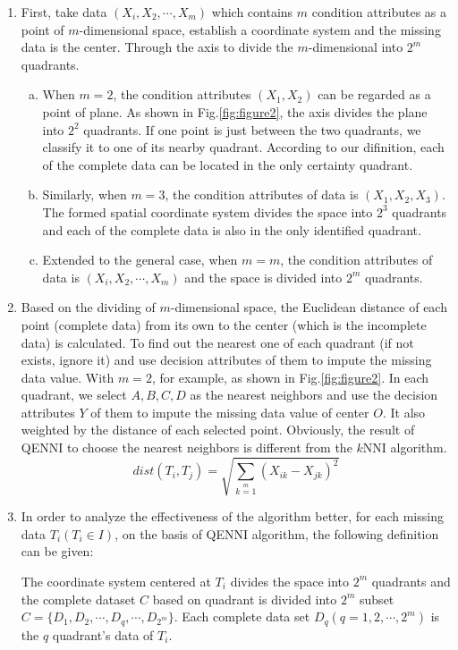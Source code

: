 \documentclass[print]{jicspack}
\begin{document}
\begin{enumerate}[(1)]
\item First, take data $(X_i, X_2, \cdots, X_m)$ which contains $m$ condition attributes as a point of $m$-dimensional space, establish a coordinate system and the missing data is the center. Through the axis to divide the $m$-dimensional into $2^m$ quadrants.
  \begin{enumerate}[a.]
  \item When $m = 2$, the condition attributes $(X_1, X_2)$ can be regarded as a point of plane. As shown in Fig.\ref{fig:figure2}, the axis divides the plane into $2^2$ quadrants. If one point is just between the two quadrants, we classify it to one of its nearby quadrant. According to our difinition, each of the complete data can be located in the only certainty quadrant.
  \item Similarly, when $m = 3$, the condition attributes of data is $(X_1, X_2, X_3)$. The formed spatial coordinate system divides the space into $2^3$ quadrants and each of the complete data is also in the only identified quadrant.
  \item Extended to the general case, when $m = m$, the condition attributes of data is $(X_i, X_2, \cdots, X_m)$ and the space is divided into $2^m$ quadrants.
  \end{enumerate}
\item Based on the dividing of $m$-dimensional space, the Euclidean distance of each point (complete data) from its own to the center (which is the incomplete data) is calculated. To find out the nearest one of each quadrant (if not exists, ignore it) and use decision attributes of them to impute the missing data value. With $m = 2$, for example, as shown in Fig.\ref{fig:figure2}. In each quadrant,  we select $A, B, C, D$ as the nearest neighbors and use the decision attributes $Y$ of them to impute the missing data value of center $O$. It also weighted by the distance of each selected point. Obviously, the result of QENNI to choose the nearest neighbors is different from the $k$NNI algorithm.
\begin{equation}
\label{eq:1}
dist(T_i, T_j) =\sqrt{ \sum\limits_{k=1}\limits^{m} (X_{ik} - X_{jk})^2}
\end{equation}
\item In order to analyze the effectiveness of the algorithm better, for each missing data $T_i (T_i \in I)$, on the basis of QENNI algorithm,  the following definition can be given:
\begin{defn} The coordinate system centered at $T_i$ divides the space into $2^m$ quadrants and the complete dataset $C$ based on quadrant is divided into $2^m$ subset $C = \{D_1, D_2, \cdots, D_q, \cdots, D_{2^m}\}$. Each complete data set $D_q (q = 1, 2, \cdots, 2^m)$ is the $q$ quadrant's data of $T_i$. \end{defn}

\end{enumerate}
\end{document}
